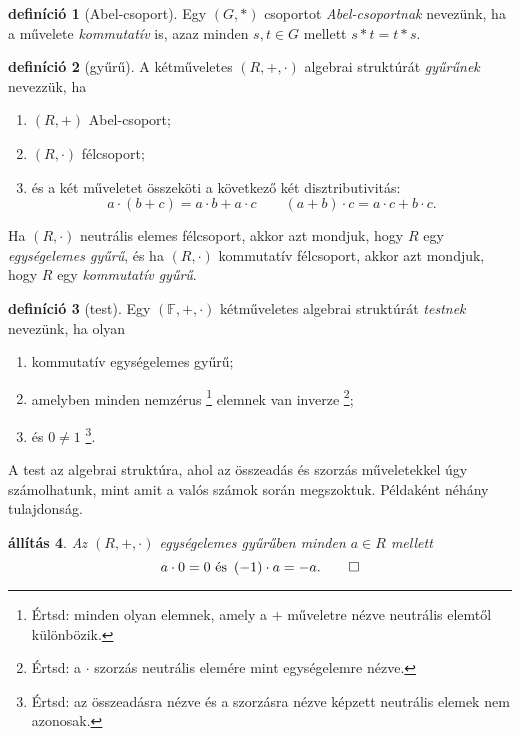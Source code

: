 \documentclass[a4paper, showtrims]{memoir}
\theoremstyle{plain}
\newtheorem{proposition}{állítás}[chapter]
\theoremstyle{remark}
\theoremstyle{definition}
\newtheorem{definition}[proposition]{definíció}
\begin{document}
\begin{definition}[Abel-csoport]
	Egy $\left( G,\ast \right)$ csoportot \emph{Abel-csoportnak} nevezünk,
	ha a művelete \emph{kommutatív} is,
	azaz minden $s,t\in G$ mellett $s\ast t=t\ast s$.
\end{definition}
\begin{definition}[gyűrű]
	A kétműveletes $\left( R,+,\cdot \right)$ algebrai struktúrát \emph{gyűrűnek} nevezzük,
	ha
	\begin{enumerate}
		\item $\left( R,+ \right)$ Abel-csoport;
		\item $\left( R,\cdot \right)$ félcsoport;
		\item és a két műveletet összeköti a következő két disztributivitás:
		      \[
			      a\cdot\left( b+c \right)=a\cdot b + a\cdot c\qquad
			      \left( a + b \right)\cdot c=a\cdot c+b\cdot c.
		      \]
	\end{enumerate}
	Ha $\left( R,\cdot \right)$ neutrális elemes félcsoport, akkor azt mondjuk, hogy $R$ egy
	\emph{egységelemes gyűrű}, és ha $\left( R,\cdot \right)$ kommutatív félcsoport, akkor
	azt mondjuk, hogy $R$ egy \emph{kommutatív gyűrű}.
\end{definition}
\begin{definition}[test]
	Egy $\left( \mathbb{F},+,\cdot \right)$ kétműveletes algebrai struktúrát \emph{testnek}
	nevezünk, ha olyan 
    \begin{enumerate}
        \item 
            kommutatív egységelemes gyűrű;
        \item
            amelyben minden nemzérus%
            \footnote{Értsd: minden olyan elemnek, 
            amely a $+$ műveletre nézve neutrális elemtől különbözik.}
            elemnek van inverze%
            \footnote{Értsd: a $\cdot$ szorzás neutrális elemére mint egységelemre nézve.};
        \item
            és $0\neq 1$%
            \footnote{Értsd: az összeadásra nézve és a szorzásra nézve képzett neutrális elemek 
            nem azonosak.}.\qedhere
    \end{enumerate}
\end{definition}
A test az algebrai struktúra, ahol az összeadás és szorzás műveletekkel úgy számolhatunk, mint amit a valós számok során megszoktuk.
Példaként néhány tulajdonság.
\begin{proposition}
	Az $\left( R,+,\cdot \right)$ egységelemes gyűrűben minden $a\in R$ mellett
	\begin{equation*}
		a\cdot 0=0\text{ és }
		\left( -1 \right)\cdot a=-a.\qedhere
	\end{equation*}
\end{proposition}
\end{document}
